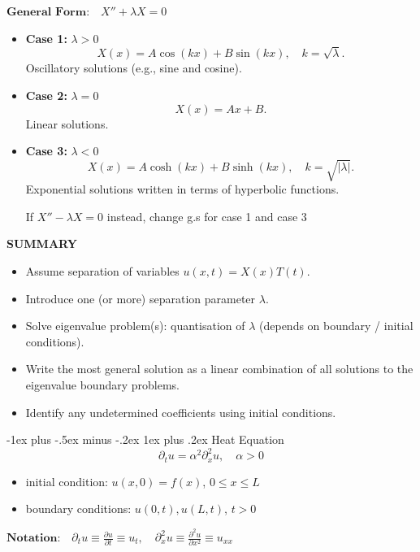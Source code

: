 \documentclass[10pt,landscape]{article}
\makeatletter
\newcommand{\lb}{\lambda}
\renewcommand{\subsubsection}{\@startsection{subsubsection}{3}{0mm}%
                                {-1ex plus -.5ex minus -.2ex}%
                                {1ex plus .2ex}%
                                {\normalfont\small\bfseries}}
\makeatother
\begin{document}
\begin{multicols}{2}
$\textbf{General Form:} \quad X'' + \lambda X = 0$

\begin{itemize}
    \item \textbf{Case 1:} \(\lambda > 0\)\\
    \[
    X(x) = A\cos(kx) + B\sin(kx), \quad k = \sqrt{\lambda}.
    \]
    Oscillatory solutions (e.g., sine and cosine).

    \item \textbf{Case 2:} \(\lambda = 0\)
    \[
    X(x) = Ax + B.
    \]
    Linear solutions.

    \item \textbf{Case 3:} \(\lambda < 0\)\\
    \[
    X(x) = A\cosh(kx) + B\sinh(kx), \quad k = \sqrt{|\lambda|}.
    \]
    Exponential solutions written in terms of hyperbolic functions.

    If $X'' -\lambda X = 0$ instead, change g.s for case 1 and case 3
\end{itemize}

\textbf{SUMMARY}
\begin{itemize}
 	\item Assume separation of variables $u(x,t) = X(x)T(t)$.
	\item Introduce one (or more) separation parameter $\lb$.
	\item Solve eigenvalue problem(s): quantisation of $\lb$ (depends on boundary / initial conditions).
	\item Write the most general solution as a linear combination of all solutions to the eigenvalue boundary problems.
	\item Identify any undetermined coefficients using initial conditions.
 \end{itemize}
 
		\subsubsection{Heat Equation}
		$$ \partial_t u =\alpha^2 \partial_x^2 u, \quad \alpha > 0 $$
		\begin{itemize}
			\item initial condition: $u(x,0) = f(x)$, $0\le x \le L $\\
			\item boundary conditions: $u(0,t), u(L,t)$, $t >0$ 
		\end{itemize}
        $\textbf{Notation:} \quad \partial_t u \equiv \frac{\partial u}{\partial t} \equiv u_t, \quad \partial_x^2 u \equiv \frac{\partial^2 u}{\partial x^2} \equiv u_{xx}$


\end{multicols}
\end{document}

